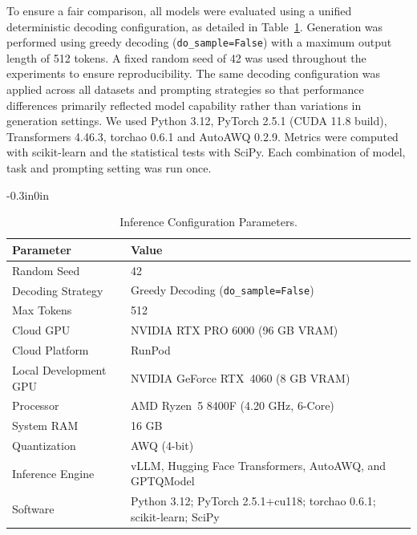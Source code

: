 \documentclass[10pt,letterpaper]{article}
\begin{document}
To ensure a fair comparison, all models were evaluated using a unified deterministic decoding configuration, as detailed in Table~\ref{tab:inference}. Generation was performed using greedy decoding (\texttt{do\_sample=False}) with a maximum output length of 512 tokens. A fixed random seed of 42 was used throughout the experiments to ensure reproducibility. The same decoding configuration was applied across all datasets and prompting strategies so that performance differences primarily reflected model capability rather than variations in generation settings. We used Python 3.12, PyTorch 2.5.1 (CUDA 11.8 build), Transformers 4.46.3, torchao 0.6.1 and AutoAWQ 0.2.9. Metrics were computed with scikit-learn and the statistical tests with SciPy. Each combination of model, task and prompting setting was run once.


\begin{table}[!t]
\begin{adjustwidth}{-0.3in}{0in}
\centering
\small
\caption{Inference Configuration Parameters.}
\label{tab:inference}
\renewcommand{\arraystretch}{1.2}
\setlength{\tabcolsep}{10pt}

\begin{tabular}{|l|p{9cm}|}
\hline
\textbf{Parameter} & \textbf{Value} \\
\hline

Random Seed & 42 \\\hline
Decoding Strategy & Greedy Decoding (\texttt{do\_sample=False}) \\\hline
Max Tokens & 512 \\\hline

Cloud GPU &
NVIDIA RTX PRO 6000 (96 GB VRAM) \\\hline

Cloud Platform &
RunPod \\\hline

Local Development GPU &
NVIDIA GeForce RTX~4060 (8 GB VRAM) \\\hline

Processor &
AMD Ryzen~5 8400F (4.20 GHz, 6-Core) \\\hline

System RAM &
16 GB \\\hline

Quantization &
AWQ (4-bit) \\\hline

Inference Engine &
vLLM, Hugging Face Transformers, AutoAWQ, and GPTQModel \\ \hline

Software &
Python 3.12; PyTorch 2.5.1+cu118; torchao 0.6.1; scikit-learn; SciPy \\ \hline

\end{tabular}

\end{adjustwidth}
\end{table}
\end{document}
